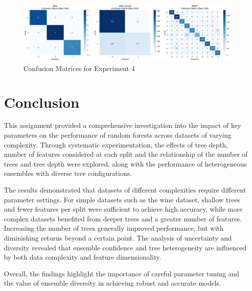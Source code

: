 \documentclass[conference]{IEEEtran}
\begin{document}
\begin{figure}[htbp]
    \centering
    \includegraphics[width=\textwidth]{figures/confusion_exp_4.png}
    \caption{Confusion Matrices for Experiment 4}
    \label{fig:confusion_matrix_best_model}
\end{figure}

\section{Conclusion}

This assignment provided a comprehensive investigation into the impact of key parameters on the performance of random forests across datasets of varying complexity. Through systematic experimentation, the effects of tree depth, number of features considered at each split and the relationship of the number of trees and tree depth were explored, along with the performance of heterogeneous ensembles with diverse tree configurations.

The results demonstrated that datasets of different complexities require different parameter settings. For simple datasets such as the wine dataset, shallow trees and fewer features per split were sufficient to achieve high accuracy, while more complex datasets benefited from deeper trees and a greater number of features. Increasing the number of trees generally improved performance, but with diminishing returns beyond a certain point. The analysis of uncertainty and diversity revealed that ensemble confidence and tree heterogeneity are influenced by both data complexity and feature dimensionality.

Overall, the findings highlight the importance of careful parameter tuning and the value of ensemble diversity in achieving robust and accurate models.



\end{document}
